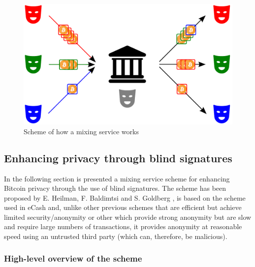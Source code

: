 \begin{figure}[!htb]
	\centering
	\includegraphics[width=1\linewidth]{img/mixing-service-scheme.png}
	\caption{Scheme of how a mixing service works}
	\label{fig:mixing-service-scheme}
\end{figure}






\subsection{Enhancing privacy through blind signatures}\label{sec:enh-sign} In
the following section is presented a mixing service scheme for enhancing Bitcoin
privacy through the use of blind signatures. The scheme has been proposed  by E.
Heilman, F. Baldimtsi and S. Goldberg \cite{heilman-blindly-signed-contracts},
is based on the scheme used in eCash \cite{Chaum1984} and, unlike other previous
schemes that are efficient but achieve limited security/anonymity or other which
provide strong anonymity but are slow and require large numbers of transactions,
it provides anonymity at reasonable speed using an untrusted third party (which
can, therefore, be malicious).

\subsubsection{High-level overview of the scheme}
